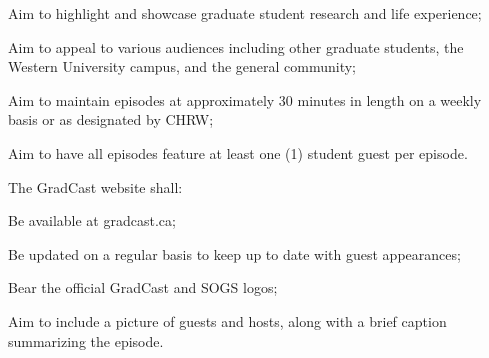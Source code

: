 \begin{longenum}[ label*=\thesubsection.\arabic*., align=left]
\begin{longenum}[label*=\arabic*., align=left]
	\item Aim to highlight and showcase graduate student research and life experience;
	\item Aim to appeal to various audiences including other graduate students, the Western University campus, and the general community;
	\item Aim to maintain episodes at approximately 30 minutes in length on a weekly basis or as designated by CHRW;
	\item Aim to have all episodes feature at least one (1) student guest per episode.
	\end{longenum}
\item The GradCast website shall:
	\begin{longenum}[label*=\arabic*., align=left]	
	\item Be available at gradcast.ca;
	\item Be updated on a regular basis to keep up to date with guest appearances;
	\item Bear the official GradCast and SOGS logos;
	\item Aim to include a picture of guests and hosts, along with a brief caption summarizing the episode.
	\end{longenum}
\end{longenum}